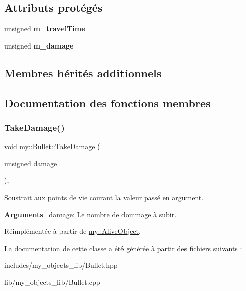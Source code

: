\subsection*{Attributs protégés}
\begin{DoxyCompactItemize}
\item 
\mbox{\label{classmy_1_1Bullet_ae24f81c42c087ec24378674c27f749a0}} 
unsigned {\bfseries m\+\_\+travel\+Time}
\item 
\mbox{\label{classmy_1_1Bullet_ab06dc2584a017781b2cf592d906c14da}} 
unsigned {\bfseries m\+\_\+damage}
\end{DoxyCompactItemize}
\subsection*{Membres hérités additionnels}


\subsection{Documentation des fonctions membres}
\mbox{\label{classmy_1_1Bullet_add56b393dfba4c70de2713d4a3c917c3}} 
\subsubsection{\texorpdfstring{Take\+Damage()}{TakeDamage()}}
{\footnotesize\ttfamily void my\+::\+Bullet\+::\+Take\+Damage (\begin{DoxyParamCaption}\item[{unsigned}]{damage }\end{DoxyParamCaption})\hspace{0.3cm}{\ttfamily [virtual]}, {\ttfamily [noexcept]}}



Soustrait aux points de vie courant la valeur passé en argument. 

{\bfseries Arguments}~\newline
 damage\+: Le nombre de dommage à subir. 

Réimplémentée à partir de \hyperlink{classmy_1_1AliveObject_a4c13171af7b862e15bfd1737a75dab75}{my\+::\+Alive\+Object}.



La documentation de cette classe a été générée à partir des fichiers suivants \+:\begin{DoxyCompactItemize}
\item 
includes/my\+\_\+objects\+\_\+lib/Bullet.\+hpp\item 
lib/my\+\_\+objects\+\_\+lib/Bullet.\+cpp\end{DoxyCompactItemize}
